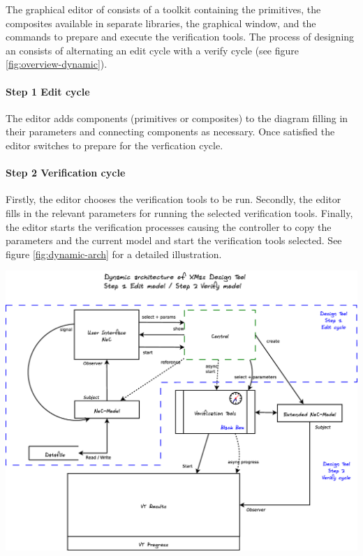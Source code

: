 The graphical editor of \Noc consists of a toolkit containing
the \xmas primitives, the composites available in separate 
libraries, the graphical window, and the commands to 
prepare and execute the verification tools. The process of 
designing an \Noc consists of alternating an edit cycle with a verify cycle 
(see figure \ref{fig:overview-dynamic}).

\paragraph{Step 1 Edit cycle} The editor adds components (primitives or 
composites) to the \Noc diagram filling in their parameters and connecting 
components as necessary. Once satisfied the editor switches to prepare 
for the verfication cycle.

\paragraph{Step 2 Verification cycle} 
Firstly, the editor chooses the verification tools to be run.
Secondly, the editor fills in the relevant parameters for running the selected 
verification tools. Finally, the editor starts the verification processes causing
the controller to copy the parameters and the current \Noc model and start
the verification tools selected. See figure \ref{fig:dynamic-arch} for a 
detailed illustration.

\begin{center}
	\includegraphics[width=.95\linewidth]{../architecture-dynamic}
	\label{fig:dynamic-arch}
\end{center}

